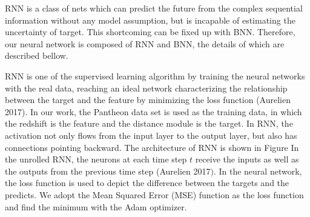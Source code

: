 \documentclass[10pt, a4paper]{article}
\begin{document}
RNN is a class of nets which can predict the future from the complex sequential information without any model assumption, but is incapable of estimating the uncertainty of target. This shortcoming can be fixed up with BNN. Therefore, our neural network is composed of RNN and BNN, the details of which are described bellow.

RNN is one of the supervised learning algorithm by training the neural networks with the real data, reaching an ideal network characterizing the relationship between the target and the feature by minimizing the loss function (Aurelien 2017). In our work, the Pantheon data set is used as the training data, in which the redshift is the feature and the distance module is the target. In $\mathrm{RNN}$, the activation not only flows from the input layer to the output layer, but also has connections pointing backward. The architecture of RNN is shown in Figure In the unrolled RNN, the neurons at each time step $t$ receive the inputs as well as the outputs from the previous time step (Aurelien 2017$)$. In the neural network, the loss function is used to depict the difference between the targets and the predicts. We adopt the Mean Squared Error (MSE) function as the loss function and find the minimum with the Adam optimizer.
\end{document}
